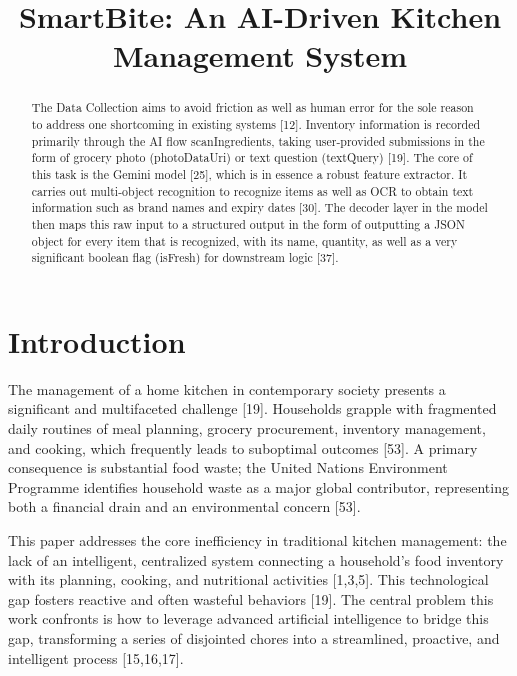 \documentclass[conference]{IEEEtran}
\newcommand{\bluecite}[1]{\textcolor{citation-blue}{[#1]}}
\begin{document}
\title{SmartBite: An AI-Driven Kitchen Management System}

\author{
}

\maketitle

\begin{abstract}
The Data Collection aims to avoid friction as well as human error for the sole reason to address one shortcoming in existing systems \bluecite{12}. Inventory information is recorded primarily through the AI flow scanIngredients, taking user-provided submissions in the form of grocery photo (photoDataUri) or text question (textQuery) \bluecite{19}. The core of this task is the Gemini model \bluecite{25}, which is in essence a robust feature extractor. It carries out multi-object recognition to recognize items as well as OCR to obtain text information such as brand names and expiry dates \bluecite{30}. The decoder layer in the model then maps this raw input to a structured output in the form of outputting a JSON object for every item that is recognized, with its name, quantity, as well as a very significant boolean flag (isFresh) for downstream logic \bluecite{37}.
\end{abstract}

\section{Introduction}

The management of a home kitchen in contemporary society presents a significant and multifaceted challenge \bluecite{19}. Households grapple with fragmented daily routines of meal planning, grocery procurement, inventory management, and cooking, which frequently leads to suboptimal outcomes \bluecite{53}. A primary consequence is substantial food waste; the United Nations Environment Programme identifies household waste as a major global contributor, representing both a financial drain and an environmental concern \bluecite{53}.

This paper addresses the core inefficiency in traditional kitchen management: the lack of an intelligent, centralized system connecting a household's food inventory with its planning, cooking, and nutritional activities \bluecite{1,3,5}. This technological gap fosters reactive and often wasteful behaviors \bluecite{19}. The central problem this work confronts is how to leverage advanced artificial intelligence to bridge this gap, transforming a series of disjointed chores into a streamlined, proactive, and intelligent process \bluecite{15,16,17}.
\end{document}
